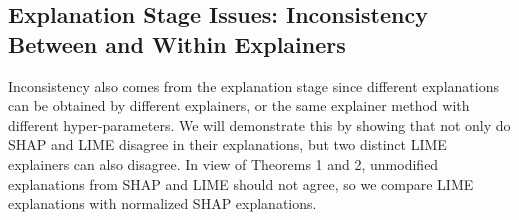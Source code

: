 \documentclass[mnsc,blindrev]{informs3}
\begin{document}

    
    
    
    \subsection{Explanation Stage Issues: Inconsistency Between and Within Explainers}
        \label{sec:conflict_between_within}
            Inconsistency also comes from the explanation stage since
            different explanations can be obtained by different explainers, or the same explainer method with different hyper-parameters.
            We will demonstrate this by showing that not only do SHAP and LIME disagree in their explanations, but two distinct LIME explainers can also disagree. In view of Theorems 1 and 2, unmodified explanations from SHAP and LIME should not agree, so we compare LIME explanations with normalized SHAP explanations. 
            
\end{document}
